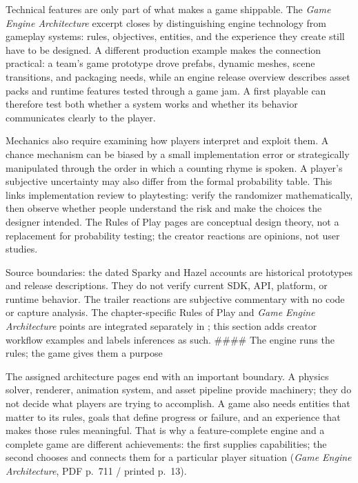 Technical features are only part of what makes a game shippable. The \emph{Game Engine Architecture} excerpt closes by distinguishing engine technology from gameplay systems: rules, objectives, entities, and the experience they create still have to be designed. A different production example makes the connection practical: a team's game prototype drove prefabs, dynamic meshes, scene transitions, and packaging needs, while an engine release overview describes asset packs and runtime features tested through a game jam. A first playable can therefore test both whether a system works and whether its behavior communicates clearly to the player.

Mechanics also require examining how players interpret and exploit them. A chance mechanism can be biased by a small implementation error or strategically manipulated through the order in which a counting rhyme is spoken. A player's subjective uncertainty may also differ from the formal probability table. This links implementation review to playtesting: verify the randomizer mathematically, then observe whether people understand the risk and make the choices the designer intended. The Rules of Play pages are conceptual design theory, not a replacement for probability testing; the creator reactions are opinions, not user studies.

Source boundaries: the dated Sparky and Hazel accounts are historical prototypes and release descriptions. They do not verify current SDK, API, platform, or runtime behavior. The trailer reactions are subjective commentary with no code or capture analysis. The chapter-specific Rules of Play and \emph{Game Engine Architecture} points are integrated separately in ; this section adds creator workflow examples and labels inferences as such. \#\#\#\# The engine runs the rules; the game gives them a purpose

The assigned architecture pages end with an important boundary. A physics solver, renderer, animation system, and asset pipeline provide machinery; they do not decide what players are trying to accomplish. A game also needs entities that matter to its rules, goals that define progress or failure, and an experience that makes those rules meaningful. That is why a feature-complete engine and a complete game are different achievements: the first supplies capabilities; the second chooses and connects them for a particular player situation (\emph{Game Engine Architecture}, PDF p.~711 / printed p.~13).

